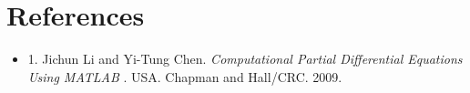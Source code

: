 \documentclass[a4paper,10pt,twoside]{article}
\begin{document}
\begin{comment}
J. D. D. Basabe and M. K. Sen, “Stability of the high-order finite elements for acoustic or elastic wave
propagation with high-order time stepping,” Geophysical Journal International, vol. 181, no. 1, pp. 577–590,
2010.

\end{comment}

\section{References}
\begin{itemize}
    \item 
    1. Jichun Li and Yi-Tung Chen. \textit{Computational Partial
Differential Equations
Using MATLAB }. USA. Chapman and Hall/CRC. 2009. 
\end{itemize}




\end{document}
